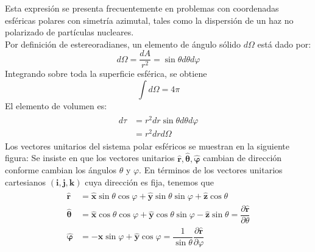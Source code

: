 Esta expresión se presenta frecuentemente en problemas con coordenadas esféricas polares con simetría azimutal, tales como la dispersión de un haz no polarizado de partículas nucleares.
\\
Por definición de estereoradianes, un elemento de ángulo sólido $d\Omega$ está dado por:
\[ d \Omega = \dfrac{dA}{r^{2}} = \sin \theta d \theta d \varphi \]
Integrando sobre toda la superficie esférica, se obtiene
\[ \int d \Omega = 4 \pi \]
El elemento de volumen es:
\begin{eqnarray}
\begin{aligned}
d \tau &= r^{2} dr \sin \theta d \theta d\varphi \\
&= r^{2} d r d \Omega
\end{aligned}
\end{eqnarray}
Los vectores unitarios del sistema polar esféricos se muestran en la siguiente figura:
%
%
Se insiste en que los vectores unitarios $\mathbf{\widehat{r}}, \bm{\widehat{\theta}}, \bm{\widehat{\varphi}}$ cambian de dirección conforme cambian los ángulos $\theta$ y $\varphi$. En términos de los vectores unitarios cartesianos $(\mathbf{i},\mathbf{j},\mathbf{k})$ cuya dirección es fija, tenemos que
\begin{eqnarray}
\begin{aligned}
\mathbf{\widehat{r}} &= \mathbf{\widehat{x}}\sin \theta \cos \varphi + \mathbf{\widehat{y}} \sin \theta \sin \varphi + \mathbf{\widehat{z}} \cos \theta \\
\bm{\widehat{\theta}} &= \mathbf{\widehat{x}}\cos \theta \cos \varphi + \mathbf{\widehat{y}} \cos \theta \sin \varphi - \mathbf{\widehat{z}} \sin \theta = \dfrac{\partial \mathbf{\widehat{r}}}{\partial \theta} \\
\bm{\widehat{\varphi}} &= - \mathbf{\widehat{x}} \sin \varphi + \mathbf{\widehat{y}} \cos \varphi = \dfrac{1}{\sin \theta} \dfrac{\partial \mathbf{\widehat{r}}}{\partial \varphi}
\end{aligned}
\end{eqnarray}
